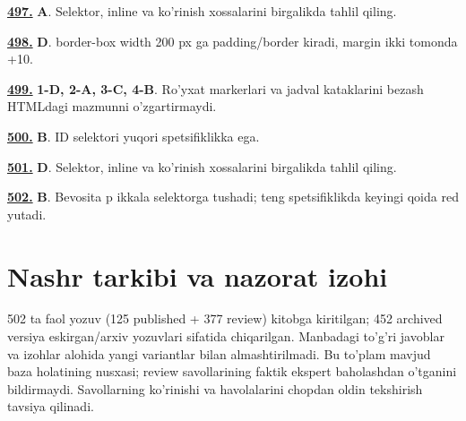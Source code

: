 \documentclass[10pt,a4paper,oneside]{article}
\begin{document}
\noindent\hyperlink{q497}{\textbf{497.}} \textbf{A}.  Selektor, inline va ko'rinish xossalarini birgalikda tahlil qiling.
\par\vspace{3mm}
\noindent\hyperlink{q498}{\textbf{498.}} \textbf{D}.  border-box width 200 px ga padding/border kiradi, margin ikki tomonda +10.
\par\vspace{3mm}
\noindent\hyperlink{q499}{\textbf{499.}} \textbf{1-D, 2-A, 3-C, 4-B}.  Ro'yxat markerlari va jadval kataklarini bezash HTMLdagi mazmunni o'zgartirmaydi.
\par\vspace{3mm}
\noindent\hyperlink{q500}{\textbf{500.}} \textbf{B}.  ID selektori yuqori spetsifiklikka ega.
\par\vspace{3mm}
\noindent\hyperlink{q501}{\textbf{501.}} \textbf{D}.  Selektor, inline va ko'rinish xossalarini birgalikda tahlil qiling.
\par\vspace{3mm}
\noindent\hyperlink{q502}{\textbf{502.}} \textbf{B}.  Bevosita p ikkala selektorga tushadi; teng spetsifiklikda keyingi qoida red yutadi.
\par\vspace{3mm}
\clearpage\section{Nashr tarkibi va nazorat izohi}
502 ta faol yozuv (125 published + 377 review) kitobga kiritilgan; 452 archived versiya eskirgan/arxiv yozuvlari sifatida chiqarilgan.
Manbadagi to'g'ri javoblar va izohlar alohida yangi variantlar bilan almashtirilmadi.
Bu to'plam mavjud baza holatining nusxasi; review savollarining faktik ekspert baholashdan o'tganini bildirmaydi.
Savollarning ko'rinishi va havolalarini chopdan oldin tekshirish tavsiya qilinadi.
\end{document}
